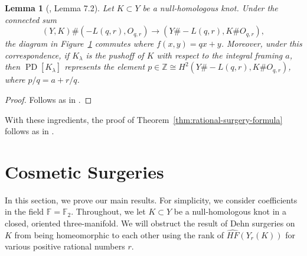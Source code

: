 \documentclass{article}
\newtheorem{lemma}[equation]{Lemma}
\theoremstyle{remark}
\numberwithin{equation}{section}
\numberwithin{table}{section}
\newcommand{\wh}{\widehat}
\renewcommand{\frak}{\mathfrak}
\DeclareMathOperator{\PD}{PD}
\renewcommand{\(}{\left(}
\renewcommand{\)}{\right)}
\newcommand{\Z}{{\mathbb{Z}}}
\newcommand{\F}{{\mathbb{F}}}
\begin{document}
\begin{lemma}[\cite{oz-sz-rational}, Lemma 7.2]
Let $K\subset Y$ be a null-homologous knot. Under the connected sum
$$(Y,K)\#(-L(q,r),O_{q,r})\to(Y\#-L(q,r),K\# O_{q,r}),$$ the diagram in Figure~\ref{fig:h2-rational-commutative-diagram} commutes where $f(x,y)=qx+y$. Moreover, under this correspondence, if $K_\lambda$ is the pushoff of $K$ with respect to the integral framing $a$, then $\PD[K_\lambda]$ represents the element $p\in\Z\cong H^2(Y\#-L(q,r),K\# O_{q,r})$, where $p/q=a+r/q$. 


\begin{figure}[h]
\centering
\caption{}
\label{fig:h2-rational-commutative-diagram}
\end{figure}


\end{lemma}

\begin{proof}
Follows as in \cite{oz-sz-rational}.
\end{proof}

With these ingredients, the proof of Theorem~\ref{thm:rational-surgery-formula} follows as in \cite{oz-sz-rational}. 







\section{Cosmetic Surgeries}

In this section, we prove our main results. For simplicity, we consider coefficients in the field $\F=\F_2$. Throughout, we let $K\subset Y$ be a null-homologous knot in a closed, oriented three-manifold. We will obstruct the result of Dehn surgeries on $K$ from being homeomorphic to each other using the rank of $\wh{HF}(Y_r(K))$ for various positive rational numbers $r$.
\end{document}
